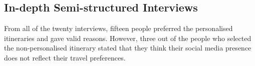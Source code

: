 \subsection{In-depth Semi-structured Interviews}

From all of the twenty interviews, fifteen people preferred the personalised
itineraries and gave valid reasons. However, three out of the people who
selected the non-personalised itinerary stated that they think their social
media presence does not reflect their travel preferences.


									




